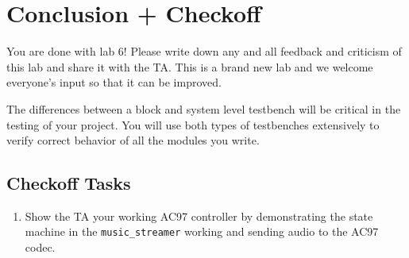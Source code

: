 \documentclass[11pt]{article}
\begin{document}
\section{Conclusion + Checkoff}
You are done with lab 6! Please write down any and all feedback and criticism of this lab and share it with the TA. This is a brand new lab and we welcome everyone's input so that it can be improved.

The differences between a block and system level testbench will be critical in the testing of your project. You will use both types of testbenches extensively to verify correct behavior of all the modules you write.

\subsection{Checkoff Tasks}

\begin{enumerate}
	\item Show the TA your working AC97 controller by demonstrating the state machine in the \verb|music_streamer| working and sending audio to the AC97 codec.
\end{enumerate}
\end{document}
